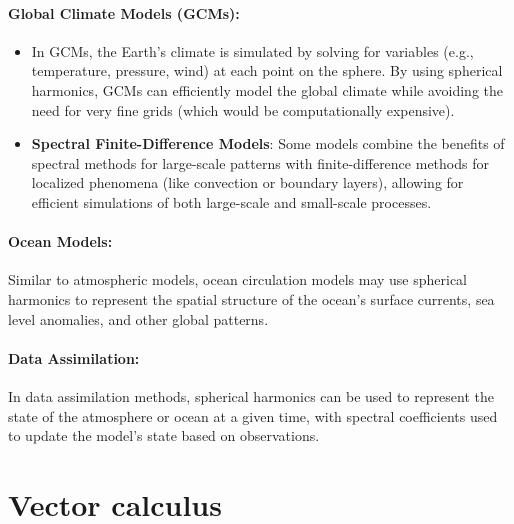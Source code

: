 \paragraph{\textbf{Global Climate Models (GCMs)}:}

\begin{itemize}
    \item In GCMs, the Earth's climate is simulated by solving for variables (e.g., temperature, pressure, wind) at each point on the sphere. By using spherical harmonics, GCMs can efficiently model the global climate while avoiding the need for very fine grids (which would be computationally expensive).
    \item \textbf{Spectral Finite-Difference Models}: Some models combine the benefits of spectral methods for large-scale patterns with finite-difference methods for localized phenomena (like convection or boundary layers), allowing for efficient simulations of both large-scale and small-scale processes.
\end{itemize}

\paragraph{\textbf{Ocean Models}:}

Similar to atmospheric models, ocean circulation models may use spherical harmonics to represent the spatial structure of the ocean's surface currents, sea level anomalies, and other global patterns.

\paragraph{\textbf{Data Assimilation}:}

In data assimilation methods, spherical harmonics can be used to represent the state of the atmosphere or ocean at a given time, with spectral coefficients used to update the model's state based on observations.
 
\section{Vector calculus}
